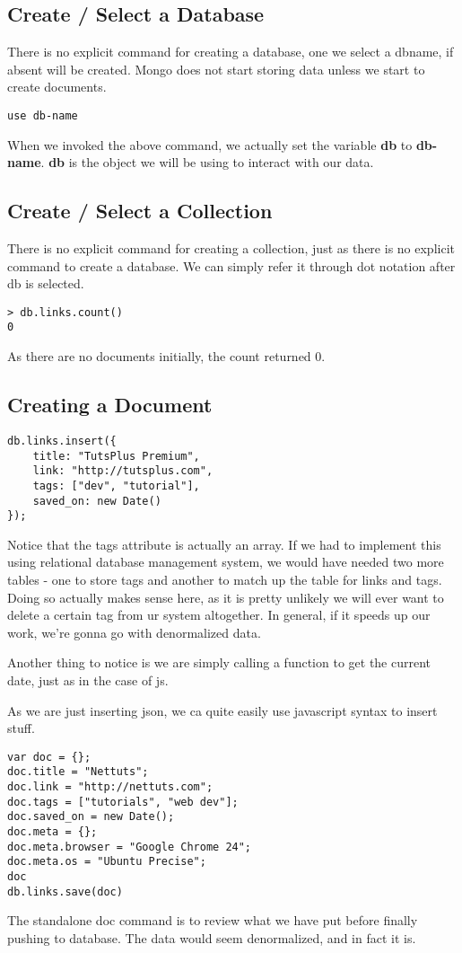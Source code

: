 \documentclass[a4paper, 12pt]{article}
\begin{document}
\subsection{Create / Select a Database}
There is no explicit command for creating a database, one we select a dbname, if absent will be created. Mongo does not start storing data unless we start to create documents.
\begin{verbatim}
use db-name
\end{verbatim}
When we invoked the above command, we actually set the variable \textbf{db} to \textbf{db-name}. \textbf{db} is the object we will be using to interact with our data.
\subsection{Create / Select a Collection}
There is no explicit command for creating a collection, just as there is no explicit command to create a database. We can simply refer it through dot notation after db is selected.
\begin{verbatim}
> db.links.count()
0
\end{verbatim}
As there are no documents initially, the count returned 0.
\subsection{Creating a Document}
\begin{verbatim}
db.links.insert({
    title: "TutsPlus Premium",
    link: "http://tutsplus.com",
    tags: ["dev", "tutorial"],
    saved_on: new Date()
});
\end{verbatim}
Notice that the tags attribute is actually an array. If we had to implement this using relational database management system, we would have needed two more tables - one to store tags and another to match up the table for links and tags. Doing so actually makes sense here, as it is pretty unlikely we will ever want to delete a certain tag from ur system altogether. In general, if it speeds up our work, we're gonna go with denormalized data.

Another thing to notice is we are simply calling a function to get the current date, just as in the case of js.

As we are just inserting json, we ca quite easily use javascript syntax to insert stuff.
\begin{verbatim}
var doc = {};
doc.title = "Nettuts";
doc.link = "http://nettuts.com";
doc.tags = ["tutorials", "web dev"];
doc.saved_on = new Date();
doc.meta = {};
doc.meta.browser = "Google Chrome 24";
doc.meta.os = "Ubuntu Precise";
doc
db.links.save(doc)
\end{verbatim}
The standalone doc command is to review what we have put before finally pushing to database. The data would seem denormalized, and in fact it is.
\end{document}
